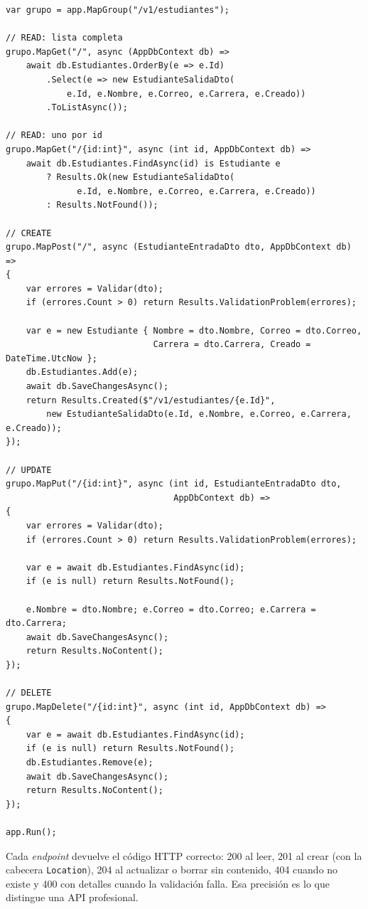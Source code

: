 \documentclass[11pt]{article}
\begin{document}
\begin{cajacodigo}
\begin{lstlisting}[style=cs]
var grupo = app.MapGroup("/v1/estudiantes");

// READ: lista completa
grupo.MapGet("/", async (AppDbContext db) =>
    await db.Estudiantes.OrderBy(e => e.Id)
        .Select(e => new EstudianteSalidaDto(
            e.Id, e.Nombre, e.Correo, e.Carrera, e.Creado))
        .ToListAsync());

// READ: uno por id
grupo.MapGet("/{id:int}", async (int id, AppDbContext db) =>
    await db.Estudiantes.FindAsync(id) is Estudiante e
        ? Results.Ok(new EstudianteSalidaDto(
              e.Id, e.Nombre, e.Correo, e.Carrera, e.Creado))
        : Results.NotFound());

// CREATE
grupo.MapPost("/", async (EstudianteEntradaDto dto, AppDbContext db) =>
{
    var errores = Validar(dto);
    if (errores.Count > 0) return Results.ValidationProblem(errores);

    var e = new Estudiante { Nombre = dto.Nombre, Correo = dto.Correo,
                             Carrera = dto.Carrera, Creado = DateTime.UtcNow };
    db.Estudiantes.Add(e);
    await db.SaveChangesAsync();
    return Results.Created($"/v1/estudiantes/{e.Id}",
        new EstudianteSalidaDto(e.Id, e.Nombre, e.Correo, e.Carrera, e.Creado));
});

// UPDATE
grupo.MapPut("/{id:int}", async (int id, EstudianteEntradaDto dto,
                                 AppDbContext db) =>
{
    var errores = Validar(dto);
    if (errores.Count > 0) return Results.ValidationProblem(errores);

    var e = await db.Estudiantes.FindAsync(id);
    if (e is null) return Results.NotFound();

    e.Nombre = dto.Nombre; e.Correo = dto.Correo; e.Carrera = dto.Carrera;
    await db.SaveChangesAsync();
    return Results.NoContent();
});

// DELETE
grupo.MapDelete("/{id:int}", async (int id, AppDbContext db) =>
{
    var e = await db.Estudiantes.FindAsync(id);
    if (e is null) return Results.NotFound();
    db.Estudiantes.Remove(e);
    await db.SaveChangesAsync();
    return Results.NoContent();
});

app.Run();
\end{lstlisting}
\end{cajacodigo}
\vspace{2pt}
Cada \emph{endpoint} devuelve el código HTTP correcto: 200 al leer, 201 al crear (con la cabecera \texttt{Location}), 204 al actualizar o borrar sin contenido, 404 cuando no existe y 400 con detalles cuando la validación falla. Esa precisión es lo que distingue una API profesional.
\end{document}
